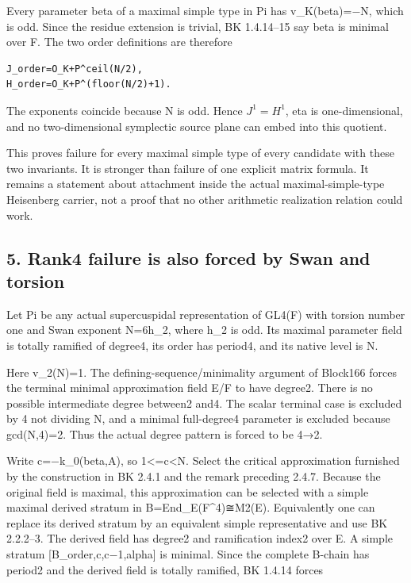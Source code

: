 Every parameter beta of a maximal simple type in Pi has v\_K(beta)=−N,
which is odd. Since the residue extension is trivial, BK 1.4.14--15 say
beta is minimal over F. The two order definitions are therefore

\begin{Verbatim}[fontsize=\small,breaklines=true,breakanywhere=true]
J_order=O_K+P^ceil(N/2),
H_order=O_K+P^(floor(N/2)+1).
\end{Verbatim}

The exponents coincide because N is odd. Hence \(J^1=H^1\),
eta is one-dimensional, and no two-dimensional symplectic source plane
can embed into this quotient.

This proves failure for every maximal simple type of every candidate
with these two invariants. It is stronger than failure of one explicit
matrix formula. It remains a statement about attachment inside the
actual maximal-simple-type Heisenberg carrier, not a proof that no other
arithmetic realization relation could work.

\hypertarget{dyadic_capacity-rank4-failure-is-also-forced-by-swan-and-torsion}{%
\subsection{5. Rank4 failure is also forced by Swan and
torsion}\label{dyadic_capacity-rank4-failure-is-also-forced-by-swan-and-torsion}}

Let Pi be any actual supercuspidal representation of GL4(F) with torsion
number one and Swan exponent N=6h\_2, where h\_2 is odd. Its maximal
parameter field is totally ramified of degree4, its order has period4,
and its native level is N.

Here v\_2(N)=1. The defining-sequence/minimality argument of Block166
forces the terminal minimal approximation field E/F to have degree2.
There is no possible intermediate degree between2 and4. The scalar
terminal case is excluded by 4 not dividing N, and a minimal
full-degree4 parameter is excluded because gcd(N,4)=2. Thus the actual
degree pattern is forced to be 4→2.

Write c=−k\_0(beta,A), so 1\textless=c\textless N. Select the critical
approximation furnished by the construction in BK 2.4.1 and the remark
preceding 2.4.7. Because the original field is maximal, this
approximation can be selected with a simple maximal derived stratum in
B=End\_E(F\^{}4)≅M2(E). Equivalently one can replace its derived stratum
by an equivalent simple representative and use BK 2.2.2--3. The derived
field has degree2 and ramification index2 over E. A simple stratum
{[}B\_order,c,c−1,alpha{]} is minimal. Since the complete B-chain has
period2 and the derived field is totally ramified, BK 1.4.14 forces

